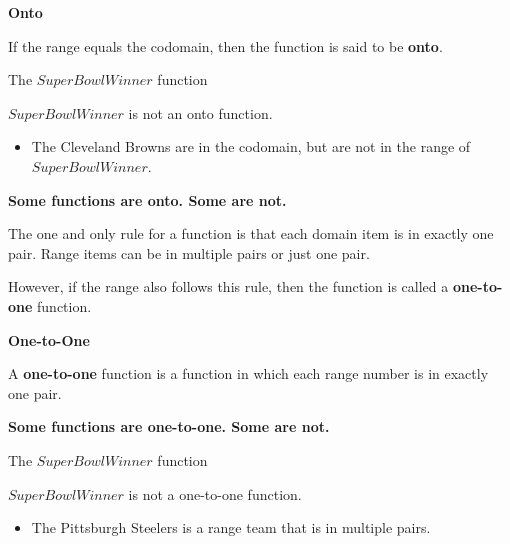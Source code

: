 \documentclass{ximera}
\begin{document}
\begin{definition} \textbf{\textcolor{green!50!black}{Onto}} 

If the range equals the codomain, then the function is said to be \textbf{onto}.

\end{definition}









\begin{example} The $SuperBowlWinner$ function


$SuperBowlWinner$ is not an onto function.


\begin{itemize}
\item The Cleveland Browns are in the codomain, but are not in the range of $SuperBowlWinner$.  
\end{itemize}

\end{example}







\textbf{\textcolor{blue!55!black}{Some functions are onto. Some are not.}}  




The one and only rule for a function is that each domain item is in exactly one pair.  Range items can be in multiple pairs or just one pair. 

However, if the range also follows this rule, then the function is called a \textbf{one-to-one} function.



\begin{definition} \textbf{\textcolor{green!50!black}{One-to-One}} 

A \textbf{one-to-one} function is a function in which each range number is in exactly one pair.

\end{definition}




\textbf{\textcolor{blue!55!black}{Some functions are one-to-one. Some are not.}}  














\begin{example} The $SuperBowlWinner$ function


$SuperBowlWinner$ is not a one-to-one function.


\begin{itemize}
\item The Pittsburgh Steelers is a range team that is in multiple pairs. 
\end{itemize}

\end{example}
\end{document}
